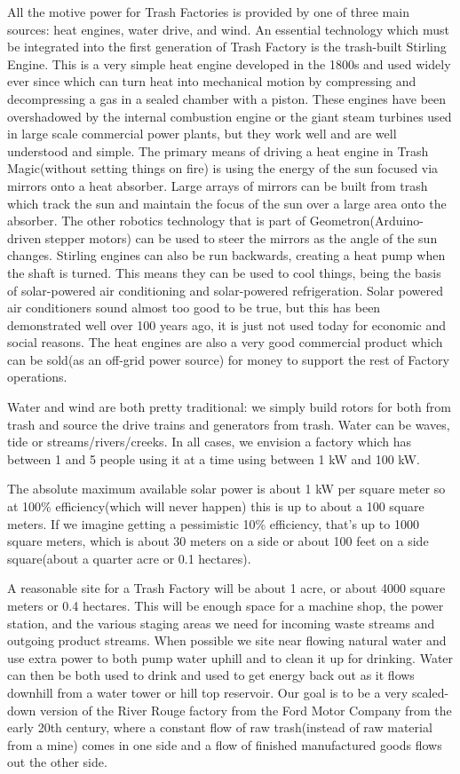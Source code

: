 All the motive power for Trash Factories is provided by one of three
main sources: heat engines, water drive, and wind. An essential
technology which must be integrated into the first generation of Trash
Factory is the trash-built Stirling Engine. This is a very simple heat
engine developed in the 1800s and used widely ever since which can turn
heat into mechanical motion by compressing and decompressing a gas in a
sealed chamber with a piston. These engines have been overshadowed by
the internal combustion engine or the giant steam turbines used in large
scale commercial power plants, but they work well and are well
understood and simple. The primary means of driving a heat engine in
Trash Magic(without setting things on fire) is using the energy of the
sun focused via mirrors onto a heat absorber. Large arrays of mirrors
can be built from trash which track the sun and maintain the focus of
the sun over a large area onto the absorber. The other robotics
technology that is part of Geometron(Arduino-driven stepper motors) can
be used to steer the mirrors as the angle of the sun changes. Stirling
engines can also be run backwards, creating a heat pump when the shaft
is turned. This means they can be used to cool things, being the basis
of solar-powered air conditioning and solar-powered refrigeration. Solar
powered air conditioners sound almost too good to be true, but this has
been demonstrated well over 100 years ago, it is just not used today for
economic and social reasons. The heat engines are also a very good
commercial product which can be sold(as an off-grid power source) for
money to support the rest of Factory operations.

Water and wind are both pretty traditional: we simply build rotors for
both from trash and source the drive trains and generators from trash.
Water can be waves, tide or streams/rivers/creeks. In all cases, we
envision a factory which has between 1 and 5 people using it at a time
using between 1 kW and 100 kW.

The absolute maximum available solar power is about 1 kW per square
meter so at 100\% efficiency(which will never happen) this is up to
about a 100 square meters. If we imagine getting a pessimistic 10\%
efficiency, that's up to 1000 square meters, which is about 30 meters on
a side or about 100 feet on a side square(about a quarter acre or 0.1
hectares).

A reasonable site for a Trash Factory will be about 1 acre, or about
4000 square meters or 0.4 hectares. This will be enough space for a
machine shop, the power station, and the various staging areas we need
for incoming waste streams and outgoing product streams. When possible
we site near flowing natural water and use extra power to both pump
water uphill and to clean it up for drinking. Water can then be both
used to drink and used to get energy back out as it flows downhill from
a water tower or hill top reservoir. Our goal is to be a very
scaled-down version of the River Rouge factory from the Ford Motor
Company from the early 20th century, where a constant flow of raw
trash(instead of raw material from a mine) comes in one side and a flow
of finished manufactured goods flows out the other side.

